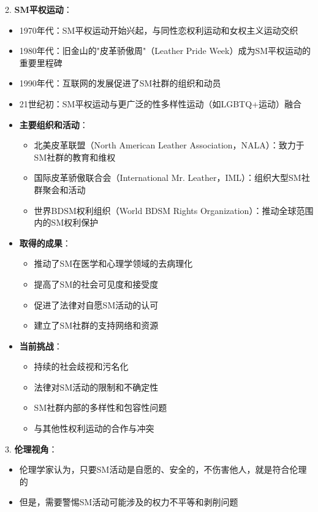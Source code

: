 \documentclass[12pt,UTF8]{ctexbook}
\begin{document}
2. \textbf{SM平权运动}：
  \begin{itemize}
    \item 1970年代：SM平权运动开始兴起，与同性恋权利运动和女权主义运动交织
    \item 1980年代：旧金山的"皮革骄傲周"（Leather Pride Week）成为SM平权运动的重要里程碑
    \item 1990年代：互联网的发展促进了SM社群的组织和动员
    \item 21世纪初：SM平权运动与更广泛的性多样性运动（如LGBTQ+运动）融合
  \item \textbf{主要组织和活动}：
    \begin{itemize}
    \item 北美皮革联盟（North American Leather Association，NALA）：致力于SM社群的教育和维权
    \item 国际皮革骄傲联合会（International Mr. Leather，IML）：组织大型SM社群聚会和活动
    \item 世界BDSM权利组织（World BDSM Rights Organization）：推动全球范围内的SM权利保护
    \end{itemize}
  \item \textbf{取得的成果}：
    \begin{itemize}
    \item 推动了SM在医学和心理学领域的去病理化
    \item 提高了SM的社会可见度和接受度
    \item 促进了法律对自愿SM活动的认可
    \item 建立了SM社群的支持网络和资源
    \end{itemize}
  \item \textbf{当前挑战}：
    \begin{itemize}
    \item 持续的社会歧视和污名化
    \item 法律对SM活动的限制和不确定性
    \item SM社群内部的多样性和包容性问题
    \item 与其他性权利运动的合作与冲突
    \end{itemize}
  \end{itemize}

3. \textbf{伦理视角}：
  \begin{itemize}
  \item 伦理学家认为，只要SM活动是自愿的、安全的，不伤害他人，就是符合伦理的
  \item 但是，需要警惕SM活动可能涉及的权力不平等和剥削问题
  \end{itemize}
\end{document}
